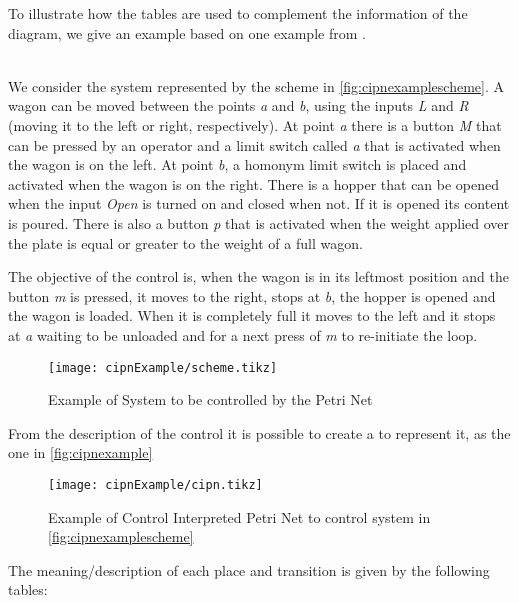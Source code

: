 To illustrate how the tables are used to complement the information of the diagram, we give an example based on one example from \cite{david1989grafcet}.
\begin{example} ~\\
  \label{ex:loadingOfAWagon}
We consider the system represented by the scheme in
\autoref{fig:cipnexamplescheme}. A wagon can be moved between the points \emph{a} and
\emph{b}, using the inputs \emph{L} and \emph{R} (moving it to the left or right,
respectively). At point \emph{a} there is a button \emph{M} that can be pressed by an
operator and a limit switch called \emph{a} that is activated when the wagon is on
the left. At point \emph{b}, a homonym limit switch is placed and activated when the
wagon is on the right. There is a hopper that can
be opened when the input \emph{Open} is turned on and closed when not. If it is opened
its content is poured. There is also a
button \emph{p} that is activated when the weight applied over the plate is equal or
greater to the weight of a full wagon. 

The objective of the control is, when the wagon is in its leftmost position and
the button \emph{m} is pressed, it moves to the right, stops at \emph{b}, the hopper is
opened and the wagon is loaded. When it is completely full it moves to the left
and it stops at \emph{a} waiting to be unloaded and for a next press of \emph{m} to re-initiate
the loop. 
\end{example}


\begin{figure}[H]
  \centering \texttt{[image: cipnExample/scheme.tikz]}
  \caption{Example of System to be controlled by the Petri Net}
  \label{fig:cipnexamplescheme}
\end{figure}
From the description of the control it is possible to create a \CIPN{} to represent it, as the one in \autoref{fig:cipnexample}


\begin{figure}[H]
  \centering \texttt{[image: cipnExample/cipn.tikz]}
  \caption{Example of Control Interpreted Petri Net to control
    system in \autoref{fig:cipnexamplescheme}}
  \label{fig:cipnexample}
\end{figure}

The meaning\slash description of each place and transition is given by the
following tables:





